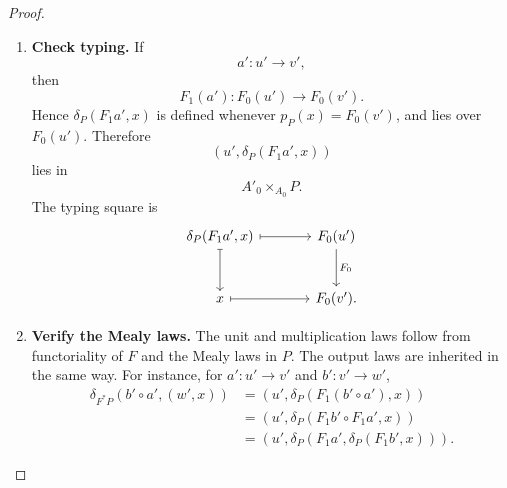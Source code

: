 \begin{proof}
    \leavevmode
    \begin{enumerate}
        \item \textbf{Check typing.}
        If
        \[
            a':u'\to v',
        \]
        then
        \[
            F_1(a'):F_0(u')\to F_0(v').
        \]
        Hence \(\delta_P(F_1a',x)\) is defined whenever
        \(p_P(x)=F_0(v')\), and lies over \(F_0(u')\). Therefore
        \[
            (u',\delta_P(F_1a',x))
        \]
        lies in
        \[
            A'_0\times_{A_0}P.
        \]
        The typing square is
        \[
        \begin{tikzcd}[column sep=large, row sep=large]
            \delta_P(F_1a',x)
                \arrow[r, maps to]
                \arrow[d, maps to]
            &
            F_0(u')
                \arrow[d, "F_0"]
            \\
            x
                \arrow[r, maps to]
            &
            F_0(v') .
        \end{tikzcd}
        \]

        \item \textbf{Verify the Mealy laws.}
        The unit and multiplication laws follow from functoriality of \(F\) and
        the Mealy laws in \(P\). The output laws are inherited in the same way.
        For instance, for \(a':u'\to v'\) and \(b':v'\to w'\),
        \[
        \begin{aligned}
            \delta_{F^*P}(b'\circ a',(w',x))
            &=
            (u',\delta_P(F_1(b'\circ a'),x)) \\
            &=
            (u',\delta_P(F_1b'\circ F_1a',x)) \\
            &=
            (u',\delta_P(F_1a',\delta_P(F_1b',x))).
        \end{aligned}
        \]


\end{enumerate}
\end{proof}
